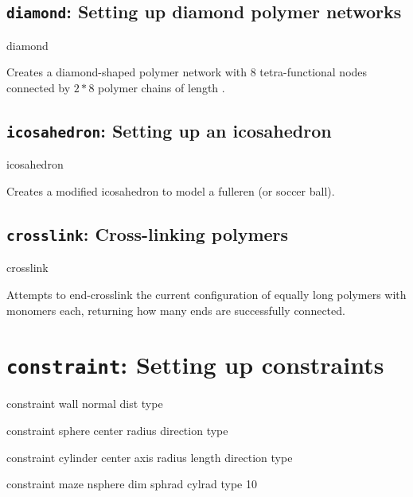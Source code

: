 \subsection{\texttt{diamond}: Setting up diamond polymer networks}
\begin{essyntax}
  diamond 
     
\end{essyntax}
Creates a diamond-shaped polymer network with 8 tetra-functional nodes
connected by $2*8$ polymer chains of length .

\subsection{\texttt{icosahedron}: Setting up an icosahedron}
\begin{essyntax}
  icosahedron 
    
\end{essyntax}
Creates a modified icosahedron to model a fulleren (or soccer ball).

\subsection{\texttt{crosslink}: Cross-linking polymers}
\begin{essyntax}
  crosslink 
    
\end{essyntax}
Attempts to end-crosslink the current configuration of 
equally long polymers with  monomers each, returning how many
ends are successfully connected. 

\section{\texttt{constraint}: Setting up constraints}

\begin{essyntax}
  constraint wall normal    
  dist  type 

  constraint sphere center    
  radius  direction  type  
  
  constraint cylinder center    
  axis    
  radius  length  
  direction  
  type  
  
  constraint maze nsphere  
  dim  sphrad  cylrad 
  type 10  

\end{essyntax}

